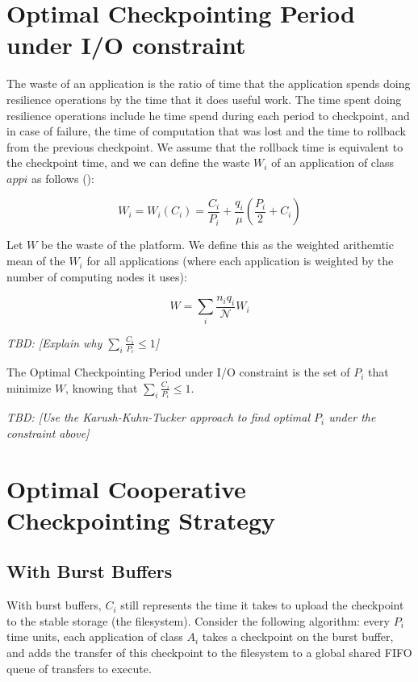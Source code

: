 \documentclass{article}
\newcommand{\nbnodesplat}{{\mathcal N}}
\newcommand{\app}[1]{A_{#1}}
\newcommand{\nbapp}[1]{n_{#1}}
\newcommand{\nbnodes}[1]{q_{#1}}
\newcommand{\period}[1]{P_{#1}}
\newcommand{\ckpt}[1]{C_{#1}}
\newcommand{\wasteapp}[1]{W_{#1}}
\newcommand{\mtbfplat}{\mu}
\newcommand{\wasteplat}{W}
\newcommand{\wastefct}[2]{W_{#1}(#2)}
\newcommand{\todo}[1]{\textit{TBD: [#1]}}
\begin{document}
\section{Optimal Checkpointing Period under I/O constraint}
\label{sec.optimal}

The waste of an application is the ratio of time that the application spends doing
resilience operations by the time that it does useful work. The time
spent doing resilience operations include he time spend during each period to
checkpoint, and in case of failure, the time of computation that was
lost and the time to rollback from the previous checkpoint. We assume
that the rollback time is equivalent to the checkpoint time, and we
can define the waste $\wasteapp{i}$ of an application of class
$app{i}$ as follows (\cite{daly}):

$$\wasteapp{i} = \wastefct{i}{\ckpt{i}} = \frac{\ckpt{i}}{\period{i}} +
\frac{\nbnodes{i}}{\mtbfplat}(\frac{\period{i}}{2} + \ckpt{i})$$

Let $\wasteplat$ be the waste of the platform. We define this as the
weighted arithemtic mean of the $\wasteapp{i}$ for all applications
(where each application is weighted by the number of computing nodes
it uses):

$$\wasteplat = \sum_i \frac{\nbapp{i} \nbnodes{i}}{\nbnodesplat} \wasteapp{i}$$

\todo{Explain why $\sum_i \frac{\ckpt{i}}{\period{i}}\leq 1$}

The Optimal Checkpointing Period under I/O constraint is the set of
$\period{i}$ that minimize $\wasteplat$, knowing that $\sum_i
\frac{\ckpt{i}}{\period{i}} \leq 1$.

\todo{Use the Karush-Kuhn-Tucker approach to find optimal
  $\period{i}$ under the constraint above}

\section{Optimal Cooperative Checkpointing Strategy}
\label{sec.strategy}

\subsection{With Burst Buffers}

With burst buffers, $\ckpt{i}$ still represents the time it takes to
upload the checkpoint to the stable storage (the filesystem).
Consider the following algorithm: every $\period{i}$ time units, each
application of class $\app{i}$ takes a checkpoint on the burst buffer,
and adds the transfer of this checkpoint to the filesystem to a global
shared FIFO queue of transfers to execute.
\end{document}
